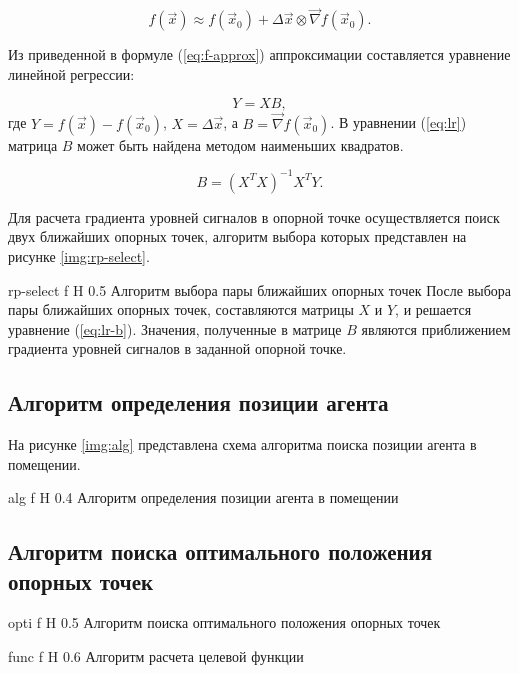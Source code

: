 \begin{equation}
    f(\vec{x}) \approx f(\vec{x}_0) + \Delta \vec{x} \otimes \vec{\nabla} f(\vec{x}_0).
    \label{eq:f-approx}
\end{equation}

\clearpage

Из приведенной в формуле (\ref{eq:f-approx}) аппроксимации составляется уравнение линейной регрессии:

\begin{equation}
    Y = XB,
    \label{eq:lr}
\end{equation}
где $Y = f(\vec{x}) - f (\vec{x}_0)$, $X = \Delta \vec{x}$, а $B = \vec{\nabla} f(\vec{x}_0)$. В уравнении (\ref{eq:lr}) матрица $B$ может быть найдена методом наименьших квадратов.

\begin{equation}
    B = (X^TX)^{-1}X^TY.
    \label{eq:lr-b}
\end{equation}

Для расчета градиента уровней сигналов в опорной точке осуществляется поиск двух ближайших опорных точек, алгоритм выбора которых представлен на рисунке \ref{img:rp-select}.

    {rp-select}
    {f}
    {H}
    {0.5\linewidth}
    {Алгоритм выбора пары ближайших опорных точек}
После выбора пары ближайших опорных точек, составляются матрицы $X$ и $Y$, и решается уравнение (\ref{eq:lr-b}). Значения, полученные в матрице $B$ являются приближением градиента уровней сигналов в заданной опорной точке.

\subsection{Алгоритм определения позиции агента}

На рисунке \ref{img:alg} представлена схема алгоритма поиска позиции агента в помещении.

    {alg}
    {f}
    {H}
    {0.4\linewidth}
    {Алгоритм определения позиции агента в помещении}

\subsection{Алгоритм поиска оптимального положения опорных точек}

    {opti}
    {f}
    {H}
    {0.5\linewidth}
    {Алгоритм поиска оптимального положения опорных точек}

    {func}
    {f}
    {H}
    {0.6\linewidth}
    {Алгоритм расчета целевой функции}

